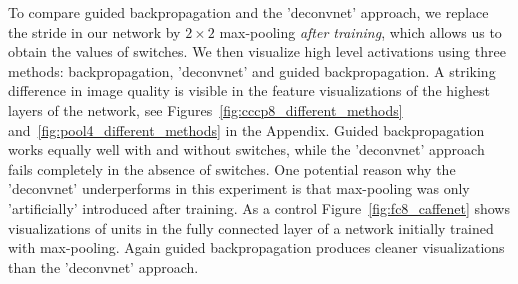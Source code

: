 \documentclass{article} %
\begin{document}
To compare guided backpropagation and the 'deconvnet' approach, we replace the stride in our network by $2\times 2$ max-pooling \emph{after training}, which allows us to obtain the values of switches. We then visualize high level activations using three methods: backpropagation, 'deconvnet' and guided backpropagation. A striking difference in image quality is visible in the feature visualizations of the highest layers of the network, see Figures~\ref{fig:cccp8_different_methods} and~\ref{fig:pool4_different_methods} in the Appendix. Guided backpropagation works equally well with and without switches, while the 'deconvnet' approach fails completely in the absence of switches. One potential reason why the 'deconvnet' underperforms in this experiment is that max-pooling was only 'artificially' introduced after training. As a control Figure~\ref{fig:fc8_caffenet} shows visualizations of units in the fully connected layer of a network initially trained with max-pooling. Again guided backpropagation produces cleaner visualizations than the 'deconvnet' approach.
\end{document}
